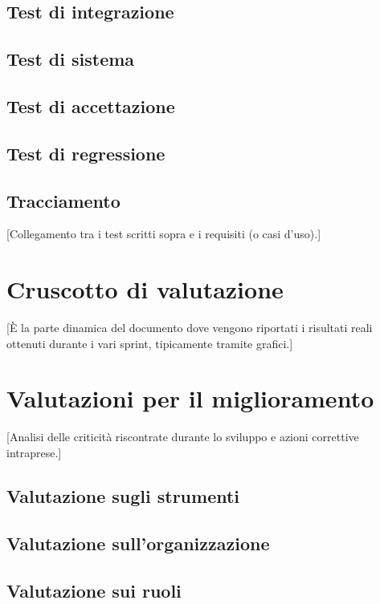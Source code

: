 \documentclass[12pt, a4paper]{article}
\begin{document}
\subsection{Test di integrazione}

\subsection{Test di sistema}

\subsection{Test di accettazione}

\subsection{Test di regressione}

\subsection{Tracciamento}
[Collegamento tra i test scritti sopra e i requisiti (o casi d'uso).]




\section{Cruscotto di valutazione}
[È la parte dinamica del documento dove vengono riportati i risultati reali ottenuti durante i vari sprint, tipicamente tramite grafici.]



\section{Valutazioni per il miglioramento}
[Analisi delle criticità riscontrate durante lo sviluppo e azioni correttive intraprese.]

\subsection{Valutazione sugli strumenti}

\subsection{Valutazione sull'organizzazione}

\subsection{Valutazione sui ruoli}
\end{document}
